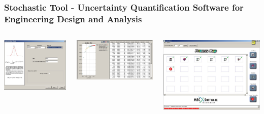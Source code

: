 \documentclass[mathserif]{beamer}
\begin{document}
\begin{frame}
\frametitle{Stochastic Tool - Uncertainty Quantification Software for Engineering Design and Analysis}

\begin{columns}[c]
\column{1.5in}
\includegraphics[width=45mm]{StocTool1.png}

\includegraphics[width=5.5cm]{StocTool4.png}

\column{3in}
\begin{center}
\includegraphics[width=7cm]{StocTool3.png}

\vspace{0.1cm}
\begin{columns}[c]
\column{1.5in}

\end{columns}
\end{center}
\end{columns}


\end{frame}
\end{document}
